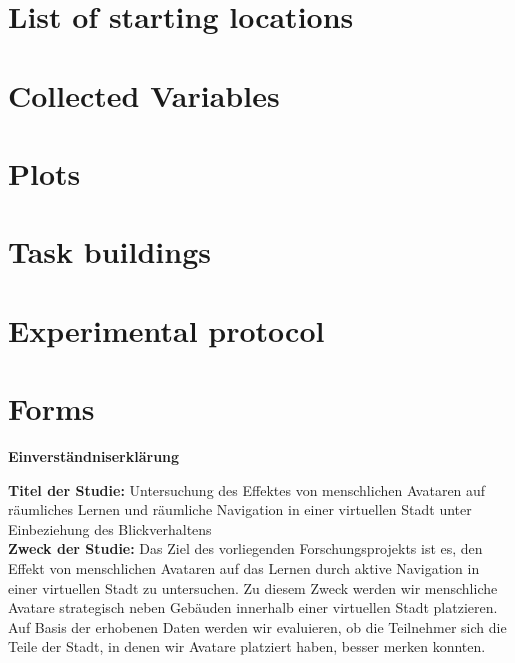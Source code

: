\chapter{List of starting locations}\label{appx:starting_locations}


\chapter{Collected Variables}\label{appx:variables}%


\chapter{Plots}\label{appx:plots}


\chapter{Task buildings}\label{appx:shop}


\chapter{Experimental protocol}\label{appx:protocol}


\chapter{Forms}\label{appx:forms}

\begin{center}
	\LARGE{\textbf{Einverständniserklärung}} \\
\end{center}


\textbf{Titel der Studie:} Untersuchung des Effektes von menschlichen Avataren auf räumliches Lernen und räumliche Navigation in einer virtuellen Stadt unter Einbeziehung des Blickverhaltens \\

\textbf{Zweck der Studie:} Das Ziel des vorliegenden Forschungsprojekts ist es, den Effekt von menschlichen Avataren auf das Lernen durch aktive Navigation in einer virtuellen Stadt zu untersuchen. Zu diesem Zweck werden wir menschliche Avatare strategisch neben Gebäuden innerhalb einer virtuellen Stadt platzieren. Auf Basis der erhobenen Daten werden wir evaluieren, ob die Teilnehmer sich die Teile der Stadt, in denen wir Avatare platziert haben, besser merken konnten. \\

